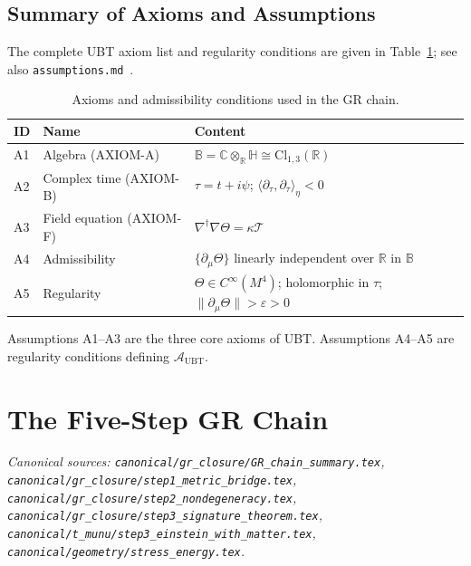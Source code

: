 \documentclass[12pt,a4paper]{article}
\theoremstyle{definition}
\theoremstyle{remark}
\newcommand{\BB}{\mathbb{B}}
\newcommand{\CC}{\mathbb{C}}
\newcommand{\RR}{\mathbb{R}}
\newcommand{\HH}{\mathbb{H}}
\newcommand{\calA}{\mathcal{A}}
\newcommand{\calT}{\mathcal{T}}
\begin{document}
\subsection{Summary of Axioms and Assumptions}

The complete UBT axiom list and regularity conditions are given in
Table~\ref{tab:axioms}; see also \texttt{assumptions.md}~\cite{jaros2026_canonical}.

\begin{table}[ht]
\centering
\caption{Axioms and admissibility conditions used in the GR chain.}
\label{tab:axioms}
\begin{tabular}{lll}
\toprule
\textbf{ID} & \textbf{Name} & \textbf{Content} \\
\midrule
A1 & Algebra (AXIOM-A) & $\BB = \CC\otimes_\RR\HH \cong \mathrm{Cl}_{1,3}(\RR)$ \\
A2 & Complex time (AXIOM-B) & $\tau = t+i\psi$; $\langle\partial_\tau,\partial_\tau\rangle_\eta < 0$ \\
A3 & Field equation (AXIOM-F) & $\nabla^\dagger\nabla\Theta = \kappa\calT$ \\
A4 & Admissibility & $\{\partial_\mu\Theta\}$ linearly independent over $\RR$ in $\BB$ \\
A5 & Regularity & $\Theta \in C^\infty(M^4)$; holomorphic in $\tau$;
                   $\|\partial_\mu\Theta\| > \varepsilon > 0$ \\
\bottomrule
\end{tabular}
\end{table}

Assumptions A1--A3 are the three core axioms of UBT.
Assumptions A4--A5 are regularity conditions defining $\calA_{\mathrm{UBT}}$.

\section{The Five-Step GR Chain}
\label{sec:chain}

\noindent\textit{Canonical sources:
\texttt{canonical/gr\_closure/GR\_chain\_summary.tex},
\texttt{canonical/gr\_closure/step1\_metric\_bridge.tex},
\texttt{canonical/gr\_closure/step2\_nondegeneracy.tex},
\texttt{canonical/gr\_closure/step3\_signature\_theorem.tex},
\texttt{canonical/t\_munu/step3\_einstein\_with\_matter.tex},
\texttt{canonical/geometry/stress\_energy.tex}.}
\end{document}
